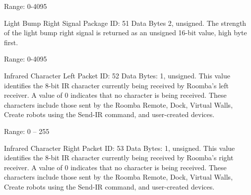 \begin{Desc}
\begin{description}
Range\+: 0-\/4095 \item[{\em 
\hypertarget{group__roomba-lib_gga46f008b5055c4a08d3123c6a3478373ead32d8a13d2506234d1358f7622725331}{}R\+O\+O\+M\+B\+A\+\_\+\+L\+I\+G\+H\+T\+\_\+\+B\+U\+M\+P\+\_\+\+R\+I\+G\+H\+T\label{group__roomba-lib_gga46f008b5055c4a08d3123c6a3478373ead32d8a13d2506234d1358f7622725331}
}]Light Bump Right Signal Package I\+D\+: 51 Data Bytes 2, unsigned. The strength of the light bump right signal is returned as an unsigned 16-\/bit value, high byte first.

Range\+: 0-\/4095 \item[{\em 
\hypertarget{group__roomba-lib_gga46f008b5055c4a08d3123c6a3478373ea9ebd0d5b7b0d25ab79377208546ed5bd}{}R\+O\+O\+M\+B\+A\+\_\+\+I\+R\+\_\+\+O\+P\+C\+O\+D\+E\+\_\+\+L\+E\+F\+T\label{group__roomba-lib_gga46f008b5055c4a08d3123c6a3478373ea9ebd0d5b7b0d25ab79377208546ed5bd}
}]Infrared Character Left Packet I\+D\+: 52 Data Bytes\+: 1, unsigned. This value identifies the 8-\/bit I\+R character currently being received by Roomba’s left receiver. A value of 0 indicates that no character is being received. These characters include those sent by the Roomba Remote, Dock, Virtual Walls, Create robots using the Send-\/\+I\+R command, and user-\/created devices.

Range\+: 0 – 255 \item[{\em 
\hypertarget{group__roomba-lib_gga46f008b5055c4a08d3123c6a3478373eaea5b0df07c05b451fc103c732c6e74eb}{}R\+O\+O\+M\+B\+A\+\_\+\+I\+R\+\_\+\+O\+P\+C\+O\+D\+E\+\_\+\+R\+I\+G\+H\+T\label{group__roomba-lib_gga46f008b5055c4a08d3123c6a3478373eaea5b0df07c05b451fc103c732c6e74eb}
}]Infrared Character Right Packet I\+D\+: 53 Data Bytes\+: 1, unsigned. This value identifies the 8-\/bit I\+R character currently being received by Roomba’s right receiver. A value of 0 indicates that no character is being received. These characters include those sent by the Roomba Remote, Dock, Virtual Walls, Create robots using the Send-\/\+I\+R command, and user-\/created devices.


\end{description}
\end{Desc}

